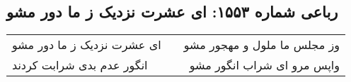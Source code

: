 \begin{center}
\section*{رباعی شماره ۱۵۵۳: ای عشرت نزدیک ز ما دور مشو}
\label{sec:1553}
\begin{longtable}{l p{0.5cm} r}
ای عشرت نزدیک ز ما دور مشو
&&
وز مجلس ما ملول و مهجور مشو
\\
انگور عدم بدی شرابت کردند
&&
واپس مرو ای شراب انگور مشو
\\
\end{longtable}
\end{center}
